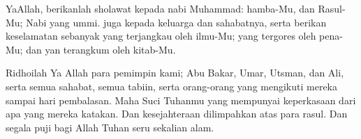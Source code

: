 \documentclass[a4paper,12pt,makeidx]{article}
\begin{document}
\vspace{0.5cm}
YaAllah, berikanlah sholawat kepada nabi Muhammad: 
hamba-Mu, dan Rasul-Mu; Nabi yang ummi.
juga kepada keluarga dan sahabatnya, 
serta berikan keselamatan sebanyak
yang terjangkau oleh ilmu-Mu;
yang tergores oleh pena-Mu;
dan yan terangkum oleh kitab-Mu.

Ridhoilah Ya Allah para pemimpin kami;
Abu Bakar, Umar, Utsman, dan Ali, serta semua sahabat,
semua tabiin, serta orang-orang yang mengikuti
mereka sampai hari pembalasan.
Maha Suci Tuhanmu yang mempunyai keperkasaan
dari apa yang mereka katakan.
Dan kesejahteraan dilimpahkan atas para rasul.
Dan segala puji bagi Allah Tuhan seru sekalian alam.
\end{document}
